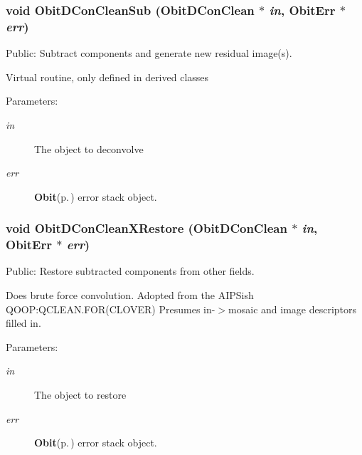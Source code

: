 \subsubsection{\setlength{\rightskip}{0pt plus 5cm}void Obit\-DCon\-Clean\-Sub ({\bf Obit\-DCon\-Clean} $\ast$ {\em in}, {\bf Obit\-Err} $\ast$ {\em err})}\label{ObitDConClean_8h_a24}


Public: Subtract components and generate new residual image(s). 

Virtual routine, only defined in derived classes \begin{Desc}
\item[Parameters:]
\begin{description}
\item[{\em in}]The object to deconvolve \item[{\em err}]{\bf Obit}{\rm (p.\,\pageref{structObit})} error stack object. \end{description}
\end{Desc}
\subsubsection{\setlength{\rightskip}{0pt plus 5cm}void Obit\-DCon\-Clean\-XRestore ({\bf Obit\-DCon\-Clean} $\ast$ {\em in}, {\bf Obit\-Err} $\ast$ {\em err})}\label{ObitDConClean_8h_a26}


Public: Restore subtracted components from other fields. 

Does brute force convolution. Adopted from the AIPSish QOOP:QCLEAN.FOR(CLOVER) Presumes in-$>$mosaic and image descriptors filled in. \begin{Desc}
\item[Parameters:]
\begin{description}
\item[{\em in}]The object to restore \item[{\em err}]{\bf Obit}{\rm (p.\,\pageref{structObit})} error stack object. \end{description}
\end{Desc}
